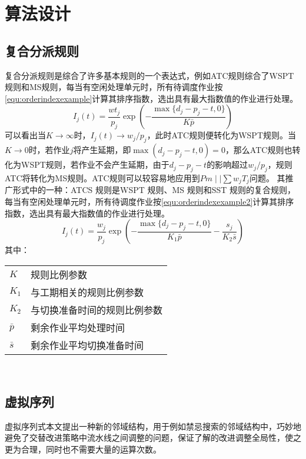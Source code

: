 \theoremheaderfont{\heiti}
\newtheorem{algori}[algor]{算法}
\newcommand{\Step}[1]{\textbf{Step#1}}
\newcommand{\refa}[1]{\textbf{算法} \ref{#1}}
\chapter{算法设计}
\section{复合分派规则}
复合分派规则是综合了许多基本规则的一个表达式，例如ATC规则综合了WSPT规则和MS规则，每当有空闲处理单元时，所有待调度作业按\eqref{equ:orderindexexample}计算其排序指数，选出具有最大指数值的作业进行处理。
\begin{equation}
I_j(t) = \frac{wt_j}{p_j}\exp\left(-\frac{\max\{d_j - p_j - t, 0\}}{K\bar p}\right) \label{equ:orderindexexample}
\end{equation}
可以看出当$K \to \infty$时，$I_j(t) \to w_j/p_j$，此时ATC规则便转化为WSPT规则。当$K \to 0$时，若作业$j$将产生延期，即$\max(d_j - p_j -t , 0 ) = 0$，那么ATC规则也转化为WSPT规则，若作业不会产生延期，由于$d_j - p_j - t$的影响超过$w_j/p_j$，规则ATC将转化为MS规则。ATC规则可以较容易地应用到$Pm\mid\mid \sum w_jT_j$问题。
其推广形式中的一种：ATCS 规则是WSPT 规则、MS 规则和SST 规则的复合规则，每当有空闲处理单元时，所有待调度作业按\eqref{equ:orderindexexample2}计算其排序指数，选出具有最大指数值的作业进行处理。
\begin{equation}
I_j(t) = \frac{w_j}{p_j}\exp\left(-\frac{\max\{d_j - p_j - t, 0\}}{K_1\bar p} - \frac{s_j}{K_2 \bar s}\right) \label{equ:orderindexexample2}
\end{equation}
其中：

\begin{tabular}{ll}
$K$ & 规则比例参数\\[5pt]
$K_1$ & 与工期相关的规则比例参数\\[5pt]
$K_2$ & 与切换准备时间的规则比例参数\\[5pt]
$\bar p$ &剩余作业平均处理时间\\[5pt]
$\bar s$ & 剩余作业平均切换准备时间
\end{tabular}\\
\section{虚拟序列}
虚拟序列式本文提出一种新的邻域结构，用于例如禁忌搜索的邻域结构中，巧妙地避免了交替改进策略中流水线之间调整的问题，保证了解的改进调整全局性，使之更为合理，同时也不需要大量的运算次数。

